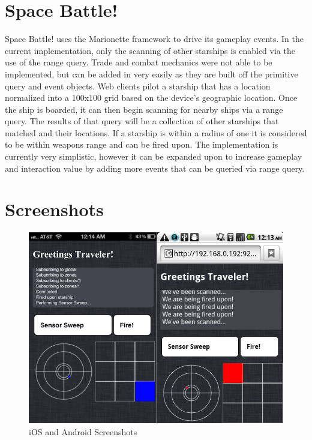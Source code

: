 \documentclass[12pt]{report}	%
\theoremstyle{definition}
\theoremstyle{remark}
\begin{document}
\section{Space Battle!}

Space Battle! uses the Marionette framework to drive its gameplay
events. In the current implementation, only the scanning of other
starships is enabled via the use of the range query. Trade and combat
mechanics were not able to be implemented, but can be added in very
easily as they are built off the primitive query and event objects. Web
clients pilot a starship that has a location normalized into a 100x100
grid based on the device's geographic location. Once the ship is boarded,
it can then begin scanning for nearby ships via a range query. The results
of that query will be a collection of other starships that matched and
their locations. If a starship is within a radius of one it is
considered to be within weapons range and can be fired upon. The
implementation is currently very simplistic, however it can be expanded
upon to increase gameplay and interaction value by adding more events
that can be queried via range query.

\section{Screenshots}

\begin{figure}[h!]
\centering
\includegraphics[scale=0.6]{4.png}
\caption{iOS and Android Screenshots}
\label{screenshot}
\end{figure}
\end{document}
